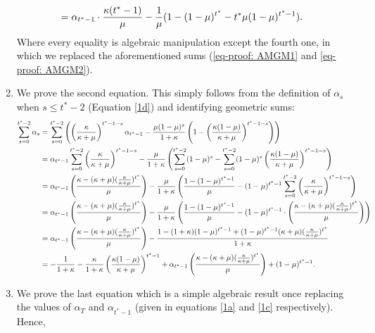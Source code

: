 \begin{enumerate}
\begin{align*}
            &= \alpha_{t^*-1} \cdot \frac{\kappa(t^*-1)}{\mu} - \frac{1}{\mu} (1 - (1-\mu)^{t^*} - t^* \mu (1-\mu)^{t^*-1}).
    \end{align*}
    Where every equality is algebraic manipulation except the fourth one, in which we replaced the aforementioned sums (\ref{eq-proof: AMGM1} and \ref{eq-proof: AMGM2}).
    \item We prove the second equation. This simply follows from the definition of $\alpha_s$ when $s \leq t^*-2$ (Equation \ref{1d}) and identifying geometric sums:
    \begin{align*}
         \sum_{s=0}^{t^*-2} \alpha_s  &=  \sum_{s=0}^{t^*-2} \left(\left(\frac{\kappa}{\kappa+\mu}\right)^{t^* - 1 - s} \alpha_{t^* -1} - \frac{\mu (1-\mu)^{s}}{ 1+ \kappa} \left( 1 - \left( \frac{\kappa(1-\mu)}{\kappa +\mu} \right)^{t^* - 1 - s} \right) \right)\\
        &=  \alpha_{t^*-1} \sum_{s=0}^{t^*-2} \left(\frac{\kappa}{\kappa+\mu}\right)^{t^* - 1 - s} - \frac{\mu}{1 + \kappa} \left( \sum_{s=0}^{t^*-2} (1-\mu)^s - \sum_{s=0}^{t^*-2} (1-\mu)^s \left( \frac{\kappa(1-\mu)}{\kappa +\mu} \right)^{t^* - 1 - s}  \right)\\
        &=  \alpha_{t^*-1} \left( \frac{\kappa - (\kappa + \mu)(\frac{\kappa}{\kappa + \mu})^{t^*}}{\mu} \right) - \frac{\mu}{1 + \kappa} \left( \frac{1 - (1-\mu)^{t^*-1}}{\mu} - (1-\mu)^{t^*-1} \sum_{s=0}^{t^*-2} \left(\frac{\kappa}{\kappa+\mu} \right)^{t^*-1-s} \right) \\
        &= \alpha_{t^*-1} \left( \frac{\kappa - (\kappa + \mu)(\frac{\kappa}{\kappa + \mu})^{t^*}}{\mu} \right) - \frac{\mu}{1+ \kappa} \left( \frac{1 - (1-\mu)^{t^*-1}}{\mu} - (1-\mu)^{t^*-1}\cdot \left( \frac{\kappa - (\kappa + \mu)(\frac{\kappa}{\kappa + \mu})^{t^*}}{\mu} \right) \right) \\
        &= \alpha_{t^*-1} \left( \frac{\kappa - (\kappa + \mu)(\frac{\kappa}{\kappa + \mu})^{t^*}}{\mu} \right) -  \frac{1-(1+\kappa)(1-\mu)^{t^*-1} + (1-\mu)^{t^*-1} (\kappa + \mu) (\frac{\kappa}{\kappa + \mu})^{t^*}}{1 + \kappa}\\
        &= -\frac{1}{1 + \kappa} - \frac{\kappa}{1 + \kappa} \left( \frac{\kappa(1-\mu)}{\kappa +\mu} \right)^{t^* - 1} +  \alpha_{t^*-1} \left( \frac{\kappa - (\kappa + \mu)(\frac{\kappa}{\kappa + \mu})^{t^*}}{\mu} \right) + (1-\mu)^{t^*-1}.
    \end{align*}
    \item We prove the last equation which is a simple algebraic result once replacing the values of $\alpha_T$ and $\alpha_{t^*-1}$ (given in equations \ref{1a} and \ref{1c} respectively). Hence,

\end{enumerate}
